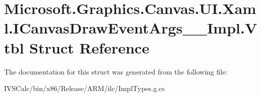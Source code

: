 \hypertarget{struct_microsoft_1_1_graphics_1_1_canvas_1_1_u_i_1_1_xaml_1_1_i_canvas_draw_event_args_____impl_1_1_vtbl}{}\section{Microsoft.\+Graphics.\+Canvas.\+U\+I.\+Xaml.\+I\+Canvas\+Draw\+Event\+Args\+\_\+\+\_\+\+Impl.\+Vtbl Struct Reference}
\label{struct_microsoft_1_1_graphics_1_1_canvas_1_1_u_i_1_1_xaml_1_1_i_canvas_draw_event_args_____impl_1_1_vtbl}


The documentation for this struct was generated from the following file\+:\begin{DoxyCompactItemize}
\item 
I\+V\+S\+Calc/bin/x86/\+Release/\+A\+R\+M/ilc/Impl\+Types.\+g.\+cs\end{DoxyCompactItemize}
